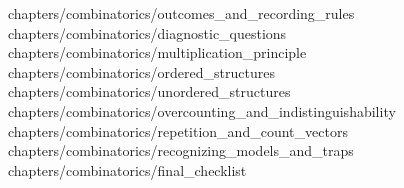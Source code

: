  {chapters/combinatorics/outcomes_and_recording_rules}
 {chapters/combinatorics/diagnostic_questions}
 {chapters/combinatorics/multiplication_principle}
 {chapters/combinatorics/ordered_structures}
 {chapters/combinatorics/unordered_structures}
 {chapters/combinatorics/overcounting_and_indistinguishability}
 {chapters/combinatorics/repetition_and_count_vectors}
 {chapters/combinatorics/recognizing_models_and_traps}
 {chapters/combinatorics/final_checklist}
